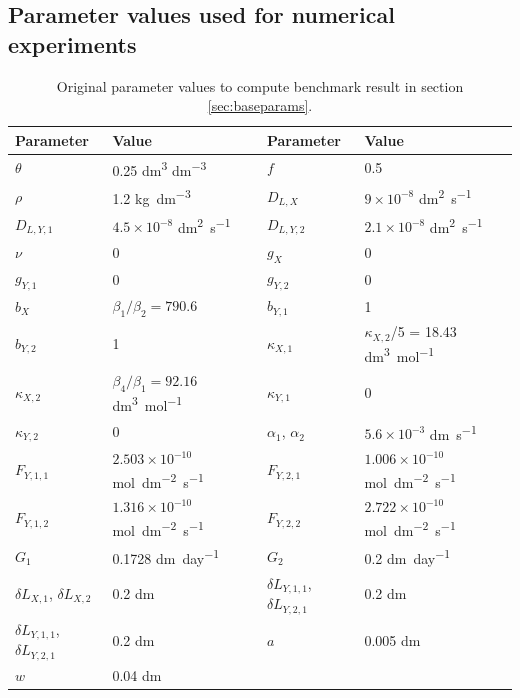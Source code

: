 \documentclass[11pt]{article}
\numberwithin{equation}{section}
\begin{document}
\subsection{Parameter values used for numerical experiments}
\label{app:parametertable}
\begin{table}[h]
\begin{center}

\fontsize{9.5}{7}\selectfont
\setlength{\tabcolsep}{5.pt}
\def\arraystretch{2.0}
\begin{tabular}{ll|ll}
\toprule
  \textbf{Parameter} & \textbf{Value} & \textbf{Parameter} & \textbf{Value}  \\
 \hline 
$\theta$ & 0.25 \si{dm^3} \si{dm^{-3}} & $f$ & 0.5 \\
$\rho$ & 1.2 \si{kg.dm^{-3}} & $D_{L,X}$ & $9 \times 10^{-8}$ \si{dm^2.s^{-1}} \\
$D_{L,Y,1}$  & $4.5 \times 10^{-8}$ \si{dm^2 . s^{-1}} & $D_{L,Y,2}$ & $2.1 \times 10^{-8}$ \si{dm^2 .s^{-1}} \\
$\nu$ & 0 & $g_X$ & 0 \\
$g_{Y,1}$ & 0 & $g_{Y,2}$ & 0 \\
$b_X$ & $\beta_1 / \beta_2 = 790.6$ & $b_{Y,1}$ & 1 \\
$b_{Y,2}$ & 1 & $\kappa_{X,1}$ & $\kappa_{X,2}$/5 = 18.43 \si{dm^3 . mol^{-1}} \\
$\kappa_{X,2}$ & $\beta_4 / \beta_1 = 92.16$ \si{dm^3 .mol^{-1}} & $\kappa_{Y,1}$ & 0 \\
$\kappa_{Y,2}$ & 0 & $\alpha_1$, $\alpha_2$ & $5.6 \times 10^{-3}$ \si{dm.s^{-1}}\\
$F_{Y,1,1}$ & $2.503 \times 10^{-10}$ \si{mol.dm^{-2}.s^{-1}} & $F_{Y,2,1}$ & $1.006 \times 10^{-10}$ \si{mol.dm^{-2}.s^{-1}} \\
$F_{Y,1,2}$ & $1.316 \times 10^{-10}$ \si{mol.dm^{-2}.s^{-1}} & $F_{Y,2,2}$ & $2.722 \times 10^{-10}$ \si{mol.dm^{-2}.s^{-1}}\\
$G_1$ & 0.1728 \si{dm.day^{-1}} & $G_2$ & 0.2 \si{dm.day^{-1}} \\
$\delta L_{X,1}$, $\delta L_{X,2}$ & 0.2 \si{dm} & $\delta L_{Y,1,1}$, $\delta L_{Y,2,1}$ & 0.2 \si{dm} \\
$\delta L_{Y,1,1}$, $\delta L_{Y,2,1}$ & 0.2 \si{dm} & $a$ & 0.005 \si{dm} \\
$w$ & 0.04 \si{dm} & & \\
\bottomrule
\end{tabular}
\caption{Original parameter values to compute benchmark result in section \ref{sec:baseparams}. \label{t:baseparams}}

\end{center}
\end{table}
\end{document}
